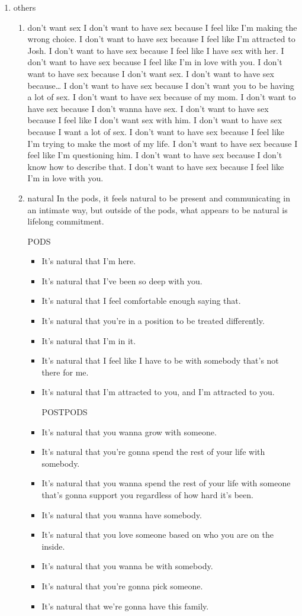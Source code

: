 \documentclass[11pt]{article}
\begin{document}
\begin{enumerate}
\item others
\label{sec:org9ba5230}
\begin{enumerate}
\item don't want sex
\label{sec:orgbfc60c9}
I don't want to have sex because I feel like I'm making the wrong choice.
I don't want to have sex because I feel like I'm attracted to Josh.
I don't want to have sex because I feel like I have sex with her.
I don't want to have sex because I feel like I'm in love with you.
I don't want to have sex because I don't want sex.
I don't want to have sex because\ldots{}
I don't want to have sex because I don't want you to be having a lot of sex.
I don't want to have sex because of my mom.
I don't want to have sex because I don't wanna have sex.
I don't want to have sex because I feel like I don't want sex with him.
I don't want to have sex because I want a lot of sex.
I don't want to have sex because I feel like I'm trying to make the most of my life.
I don't want to have sex because I feel like I'm questioning him.
I don't want to have sex because I don't know how to describe that.
I don't want to have sex because I feel like I'm in love with you.
\item natural
\label{sec:orgc2ce74e}
In the pods, it feels natural to be present and communicating in an
intimate way, but outside of the pods, what appears to be natural is
lifelong commitment. 

PODS
\begin{itemize}
\item It's natural that I'm here.
\item It's natural that I've been so deep with you.
\item It's natural that I feel comfortable enough saying that.
\item It's natural that you're in a position to be treated differently.
\item It's natural that I'm in it.
\item It's natural that I feel like I have to be with somebody that's not
there for me.
\item It's natural that I'm attracted to you, and I'm attracted to you.

POSTPODS
\item It's natural that you wanna grow with someone.
\item It's natural that you're gonna spend the rest of your life with
somebody.
\item It's natural that you wanna spend the rest of your life with someone
that's gonna support you regardless of how hard it's been.
\item It's natural that you wanna have somebody.
\item It's natural that you love someone based on who you are on the
inside.
\item It's natural that you wanna be with somebody.
\item It's natural that you're gonna pick someone.
\item It's natural that we're gonna have this family.
\end{itemize}


\end{enumerate}
\end{enumerate}
\end{document}
